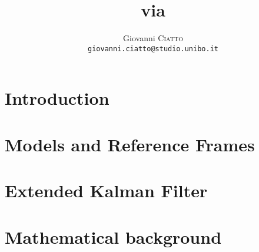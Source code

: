 \documentclass[a4paper,12pt]{article}
\title{\textbf{\Slam{} via \Ekf{}}}
\author{
	Giovanni \textsc{Ciatto} \\ \texttt{giovanni.ciatto@studio.unibo.it} \\
}
\numberwithin{equation}{section}
\theoremstyle{remark}
\newcommand{\Ekf}{Extended Kalman Filter}
\begin{document}
	
	\maketitle
	
	\section{Introduction}
		
		
	\section{Models and Reference Frames}
		
		
	\section{\Ekf}
		
		
	\newpage
	\appendix
	\section{Mathematical background}
		
	
	\newpage
	{}
	
			
\end{document}
